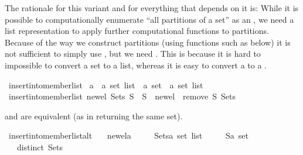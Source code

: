 \begin{isabellebody}
\begin{isamarkuptext}
   The rationale for this variant and for everything that depends on it is:
   While it is possible to computationally enumerate ``all partitions of a set'' as an
   , we need a list representation to apply further computational
   functions to partitions.  Because of the way we construct partitions (using functions
   such as  below) it is not sufficient to simply use 
   , but we need .  This is because it is hard 
   to impossible to convert a set to a list, whereas it is easy to convert a  to a .%
\end{isamarkuptext}%
\isamarkuptrue%
\isamarkupfalse%
\ insert{\isacharunderscore}into{\isacharunderscore}member{\isacharunderscore}list\isanewline
{\isacharcolon}{\isacharcolon}\ {\isachardoublequoteopen}{\isacharprime}a\ {\isasymRightarrow}\ {\isacharprime}a\ set\ list\ {\isasymRightarrow}\ {\isacharprime}a\ set\ {\isasymRightarrow}\ {\isacharprime}a\ set\ list{\isachardoublequoteclose}\isanewline
{}\ {\isachardoublequoteopen}insert{\isacharunderscore}into{\isacharunderscore}member{\isacharunderscore}list\ new{\isacharunderscore}el\ Sets\ S\ {\isacharequal}\ {\isacharparenleft}S\ {\isasymunion}\ {\isacharbraceleft}new{\isacharunderscore}el{\isacharbraceright}{\isacharparenright}\ {\isacharhash}\ {\isacharparenleft}remove{}\ S\ Sets{\isacharparenright}{\isachardoublequoteclose}%
\begin{isamarkuptext}%
 and  are equivalent
  (as in returning the same set).%
\end{isamarkuptext}%
\isamarkuptrue%
\isamarkupfalse%
\ insert{\isacharunderscore}into{\isacharunderscore}member{\isacharunderscore}list{\isacharunderscore}alt{\isacharcolon}\isanewline
\ \ \ new{\isacharunderscore}el{\isacharcolon}{\isacharcolon}{\isacharprime}a\isanewline
\ \ \ \ \ Sets{\isacharcolon}{\isacharcolon}{\isachardoublequoteopen}{\isacharprime}a\ set\ list{\isachardoublequoteclose}\isanewline
\ \ \ \ \ S{\isacharcolon}{\isacharcolon}{\isachardoublequoteopen}{\isacharprime}a\ set{\isachardoublequoteclose}\isanewline
\ \ \ {\isachardoublequoteopen}distinct\ Sets{\isachardoublequoteclose}\isanewline

\end{isabellebody}
